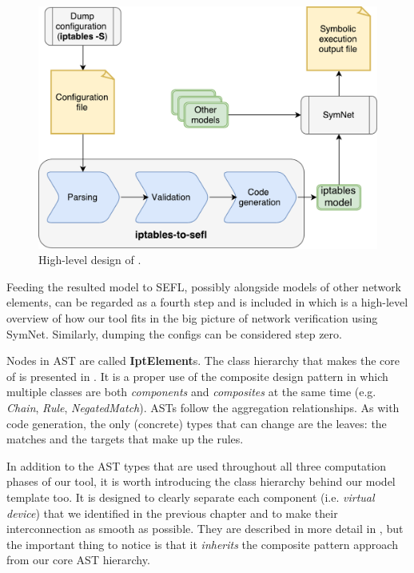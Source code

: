 \begin{figure}[h]
  \centering
  \captionsetup{justification=centering}
  \includegraphics[scale=0.5]{src/img/high-level-design}
  \caption{High-level design of \TOOL.}
  \label{fig:high-level-design}
\end{figure}

Feeding the resulted model to SEFL, possibly alongside models of other network
elements, can be regarded as a fourth step and is included in
 which is a high-level overview of
how our tool fits in the big picture of network verification using SymNet.
Similarly, dumping the configs can be considered step zero.

Nodes in AST are called \textbf{IptElement}s.  The class hierarchy that makes
the core of \TOOL is presented in .
It is a proper use of the composite design pattern in which multiple classes
are both \emph{components} and \emph{composites} at the same time (e.g.
\emph{Chain}, \emph{Rule}, \emph{NegatedMatch}).  ASTs follow the aggregation
relationships.  As with code generation, the only (concrete) types that can
change are the leaves: the matches and the targets that make up the rules.

In addition to the AST types that are used throughout all three computation
phases of our tool, it is worth introducing the class hierarchy behind our
model template too.  It is designed to clearly separate each component (i.e.
\emph{virtual device}) that we identified in the previous chapter and to make
their interconnection as smooth as possible. They are described in more detail
in , but the important thing to notice is
that it \emph{inherits} the composite pattern approach from our core AST
hierarchy.

